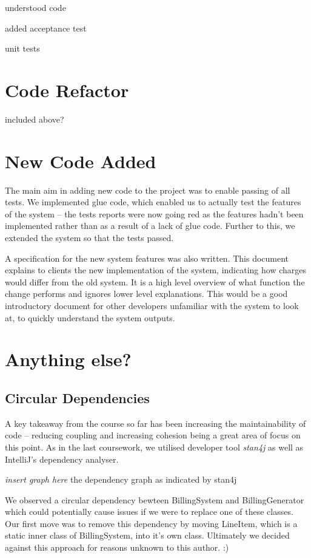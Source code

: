 \documentclass[a4paper]{article}
\begin{document}
understood code

added acceptance test

unit tests

\section{Code Refactor}
included above?

\section{New Code Added}

The main aim in adding new code to the project was to enable passing of all tests.
We implemented glue code, which enabled us to actually test the features of the
system -- the tests reports were now going red as the features hadn't been implemented
rather than as a result of a lack of glue code. Further to this, we extended the
system so that the tests passed.

A specification for the new system features was also written. This document explains
to clients the new implementation of the system, indicating how charges would differ
from the old system. It is a high level overview of what function the change performs
and ignores lower level explanations. This would be a good introductory document
for other developers unfamiliar with the system to look at, to quickly understand
the system outputs.

\section{Anything else?}

\subsection{Circular Dependencies}

A key takeaway from the course so far has been increasing the maintainability of
code -- reducing coupling and increasing cohesion being a great area of focus on
this point. As in the last coursework, we utilised developer tool \emph{stan4j} as
well as IntelliJ's dependency analyser.

\emph{insert graph here} the dependency graph as indicated by stan4j

We observed a circular dependency bewteen BillingSystem and BillingGenerator which
could potentially cause issues if we were to replace one of these classes. Our
first move was to remove this dependency by moving LineItem, which is a static inner class
of BillingSystem, into it's own class. Ultimately we decided against this approach
for reasons unknown to this author. :)
\end{document}
